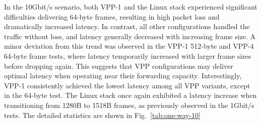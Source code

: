 In the 10Gbit/s scenario, both VPP-1 and the Linux stack experienced significant difficulties delivering 64-byte frames, resulting in high packet loss and dramatically increased latency.
In contrast, all other configurations handled the traffic without loss, and latency generally decreased with increasing frame size.
A minor deviation from this trend was observed in the VPP-1 512-byte and VPP-4 64-byte frame tests, where latency temporarily increased with larger frame sizes before dropping again.
This suggests that VPP configurations may deliver optimal latency when operating near their forwarding capacity.
Interestingly, VPP-1 consistently achieved the lowest latency among all VPP variants, except in the 64-byte test.
The Linux stack once again exhibited a latency increase when transitioning from 1280B to 1518B frames, as previously observed in the 1Gbit/s tests.
The detailed statistics are shown in Fig.~\ref{tab:one-way-10}

